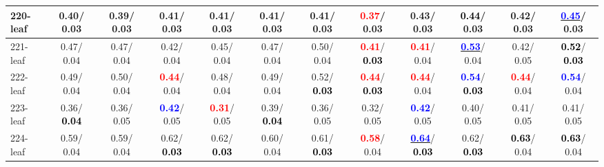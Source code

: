 \begin{table}[h]
\begin{center}
{\begin{tabular}{lc|c|c|c|c|c|c|c|c|c|c}
220-leaf &   0.40/  0.03 &   0.39/  0.03 &   0.41/  0.03 &   0.41/  0.03 &   0.41/  0.03 &   0.41/  0.03 & \textcolor{red}{\textbf{  0.37}}/  0.03 &   0.43/  0.03 & \textcolor{black}{\textbf{  0.44}}/  0.03 &   0.42/  0.03 & \underline{\textcolor{blue}{\textbf{  0.45}}}/  0.03 \\ \hline
221-leaf &   0.47/  0.04 &   0.47/  0.04 &   0.42/  0.04 &   0.45/  0.04 &   0.47/  0.04 &   0.50/  0.04 & \textcolor{red}{\textbf{  0.41}}/\textcolor{black}{\textbf{  0.03}} & \textcolor{red}{\textbf{  0.41}}/  0.04 & \underline{\textcolor{blue}{\textbf{  0.53}}}/  0.04 &   0.42/  0.05 & \textcolor{black}{\textbf{  0.52}}/\textcolor{black}{\textbf{  0.03}} \\
222-leaf &   0.49/  0.04 &   0.50/  0.04 & \textcolor{red}{\textbf{  0.44}}/  0.04 &   0.48/  0.04 &   0.49/  0.04 &   0.52/\textcolor{black}{\textbf{  0.03}} & \textcolor{red}{\textbf{  0.44}}/\textcolor{black}{\textbf{  0.03}} & \textcolor{red}{\textbf{  0.44}}/  0.04 & \textcolor{blue}{\textbf{  0.54}}/\textcolor{black}{\textbf{  0.03}} & \textcolor{red}{\textbf{  0.44}}/  0.04 & \textcolor{blue}{\textbf{  0.54}}/  0.04 \\
223-leaf &   0.36/\textcolor{black}{\textbf{  0.04}} &   0.36/  0.05 & \textcolor{blue}{\textbf{  0.42}}/  0.05 & \textcolor{red}{\textbf{  0.31}}/  0.05 &   0.39/\textcolor{black}{\textbf{  0.04}} &   0.36/  0.05 &   0.32/  0.05 & \textcolor{blue}{\textbf{  0.42}}/  0.05 &   0.40/  0.05 &   0.41/  0.05 &   0.41/  0.05 \\
224-leaf &   0.59/  0.04 &   0.59/  0.04 &   0.62/\textcolor{black}{\textbf{  0.03}} &   0.62/\textcolor{black}{\textbf{  0.03}} &   0.60/  0.04 &   0.61/\textcolor{black}{\textbf{  0.03}} & \textcolor{red}{\textbf{  0.58}}/  0.04 & \underline{\textcolor{blue}{\textbf{  0.64}}}/\textcolor{black}{\textbf{  0.03}} &   0.62/\textcolor{black}{\textbf{  0.03}} & \textcolor{black}{\textbf{  0.63}}/  0.04 & \textcolor{black}{\textbf{  0.63}}/  0.04 \\\end{tabular}}\label{stratsALCKappa6AllReduxa}
\end{center}
\end{table}
